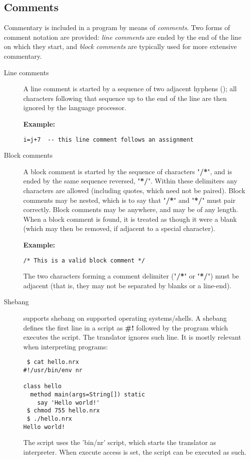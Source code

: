 \subsection{Comments}\label{refcomment}
\index{,}
\index{,}
\index{,}
 Commentary is included in a \nr{} program by means of
\emph{comments}.  Two forms of comment notation are provided:
\emph{line comments} are ended by the end of the line on which they
start, and \emph{block comments} are typically used for more extensive
commentary.
\begin{description}
\item[Line comments]\label{reflineco}

A line comment is started by a sequence of two adjacent hyphens
(\doublehyphen{}); all characters following that sequence up to the
end of the line are then ignored by the \nr{} language processor.
 
\textbf{Example:}
\begin{lstlisting}
i=j+7  -- this line comment follows an assignment
\end{lstlisting}
\item[Block comments]\label{refblockco}
 A block comment is started by the sequence of characters
"\textbf{/*}", and is ended by the same sequence reversed,
"\textbf{*/}".
Within these delimiters any characters are allowed (including quotes,
which need not be paired).
Block comments may be nested, which is to say that
"\textbf{/*}" and "\textbf{*/}" must pair correctly.
Block comments may be anywhere, and may be of any length.
When a block comment is found, it is treated as though it were a blank
(which may then be removed, if adjacent to a special character).
 
\textbf{Example:}
\begin{lstlisting}
/* This is a valid block comment */
\end{lstlisting}
The two characters forming a comment delimiter
("\textbf{/*}" or "\textbf{*/}") must be adjacent
(that is, they may not be separated by blanks or a line-end).

\item[Shebang]\label{shebang}
\nr{} supports shebang on supported operating systems/shells.
A shebang defines the first line in a script as \textbf{\#}\textbf{!} followed by the program which executes the script.
The translator ignores such line.
It is mostly relevant when interpreting \nr{} programs:
\begin{lstlisting}
 $ cat hello.nrx 
#!/usr/bin/env nr 

class hello
  method main(args=String[]) static
    say 'Hello world!' 
 $ chmod 755 hello.nrx 
 $ ./hello.nrx 
Hello world!
\end{lstlisting}
The script uses the 'bin/nr' script, which starts the translator as interpreter. 
When execute access is set, the script can be executed as such.
\end{description}
